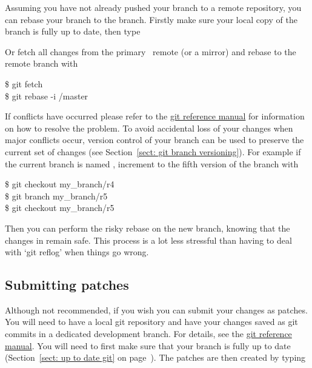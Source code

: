 Assuming you have not already pushed your branch to a remote repository, you can rebase your branch to the  branch.
Firstly make sure your local copy of the  branch is fully up to date, then type


Or fetch all changes from the primary \relaxHome\ remote (or a mirror) and rebase to the remote  branch with

\begin{exampleenv}
\$ git fetch \relaxHomeRemoteName \\
\$ git rebase -i \relaxHomeRemoteName/master
\end{exampleenv}

If conflicts have occurred please refer to the \href{https://git-scm.com/docs}{git reference manual} for information on how to resolve the problem.
To avoid accidental loss of your changes when major conflicts occur, version control of your branch can be used to preserve the current set of changes (see Section~\ref{sect: git branch versioning}).
For example if the current branch is named , increment to the fifth version of the branch with

\begin{exampleenv}
\$ git checkout my\_branch/r4 \\
\$ git branch my\_branch/r5 \\
\$ git checkout my\_branch/r5
\end{exampleenv}

Then you can perform the risky rebase on the new  branch, knowing that the changes in  remain safe.
This process is a lot less stressful than having to deal with `git reflog' when things go wrong.


\subsection{Submitting patches}

Although not recommended, if you wish you can submit your changes as patches.
You will need to have a local git repository and have your changes saved as git commits in a dedicated development branch.
For details, see the \href{https://git-scm.com/docs}{git reference manual}.
You will need to first make sure that your branch is fully up to date (Section~\ref{sect: up to date git} on page~\pageref{sect: up to date git}).
The patches are then created by typing

